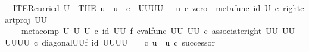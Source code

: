 \begin{isabellebody}
\ \ {\isachardoublequoteopen}ITER{\isacharunderscore}{\kern0pt}curried\ U\ {\isacharequal}{\kern0pt}\ {\isacharparenleft}{\kern0pt}THE\ u\ {\isachardot}{\kern0pt}\ u\ {\isacharcolon}{\kern0pt}\ {\isasymnat}\isactrlsub c\ {\isasymrightarrow}\ {\isacharparenleft}{\kern0pt}U\isactrlbsup U\isactrlesup {\isacharparenright}{\kern0pt}\isactrlbsup U\isactrlbsup U\isactrlesup \isactrlesup \ {\isasymand}\ \ u\ {\isasymcirc}\isactrlsub c\ zero\ {\isacharequal}{\kern0pt}\ {\isacharparenleft}{\kern0pt}metafunc\ {\isacharparenleft}{\kern0pt}id\ U{\isacharparenright}{\kern0pt}\ {\isasymcirc}\isactrlsub c\ {\isacharparenleft}{\kern0pt}right{\isacharunderscore}{\kern0pt}cart{\isacharunderscore}{\kern0pt}proj\ {\isacharparenleft}{\kern0pt}U\isactrlbsup U\isactrlesup {\isacharparenright}{\kern0pt}\ {\isasymone}{\isacharparenright}{\kern0pt}{\isacharparenright}{\kern0pt}\isactrlsup {\isasymsharp}\ {\isasymand}\isanewline
\ \ \ \ {\isacharparenleft}{\kern0pt}{\isacharparenleft}{\kern0pt}meta{\isacharunderscore}{\kern0pt}comp\ U\ U\ U{\isacharparenright}{\kern0pt}\ {\isasymcirc}\isactrlsub c\ {\isacharparenleft}{\kern0pt}id\ {\isacharparenleft}{\kern0pt}U\isactrlbsup U\isactrlesup {\isacharparenright}{\kern0pt}\ {\isasymtimes}\isactrlsub f\ eval{\isacharunderscore}{\kern0pt}func\ {\isacharparenleft}{\kern0pt}U\isactrlbsup U\isactrlesup {\isacharparenright}{\kern0pt}\ {\isacharparenleft}{\kern0pt}U\isactrlbsup U\isactrlesup {\isacharparenright}{\kern0pt}{\isacharparenright}{\kern0pt}\ {\isasymcirc}\isactrlsub c\ {\isacharparenleft}{\kern0pt}associate{\isacharunderscore}{\kern0pt}right\ {\isacharparenleft}{\kern0pt}U\isactrlbsup U\isactrlesup {\isacharparenright}{\kern0pt}\ {\isacharparenleft}{\kern0pt}U\isactrlbsup U\isactrlesup {\isacharparenright}{\kern0pt}\ {\isacharparenleft}{\kern0pt}{\isacharparenleft}{\kern0pt}U\isactrlbsup U\isactrlesup {\isacharparenright}{\kern0pt}\isactrlbsup U\isactrlbsup U\isactrlesup \isactrlesup {\isacharparenright}{\kern0pt}{\isacharparenright}{\kern0pt}\ {\isasymcirc}\isactrlsub c\ {\isacharparenleft}{\kern0pt}diagonal{\isacharparenleft}{\kern0pt}U\isactrlbsup U\isactrlesup {\isacharparenright}{\kern0pt}{\isasymtimes}\isactrlsub f\ id\ {\isacharparenleft}{\kern0pt}{\isacharparenleft}{\kern0pt}U\isactrlbsup U\isactrlesup {\isacharparenright}{\kern0pt}\isactrlbsup U\isactrlbsup U\isactrlesup \isactrlesup {\isacharparenright}{\kern0pt}{\isacharparenright}{\kern0pt}{\isacharparenright}{\kern0pt}\isactrlsup {\isasymsharp}\ \ \ \ {\isasymcirc}\isactrlsub c\ u\ {\isacharequal}{\kern0pt}\ u\ {\isasymcirc}\isactrlsub c\ successor{\isacharparenright}{\kern0pt}{\isachardoublequoteclose}\isanewline

\end{isabellebody}

